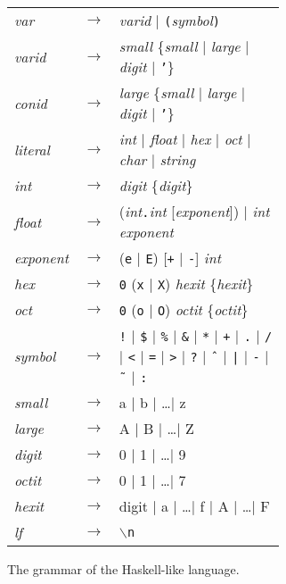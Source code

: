 \begin{figure}
\begin{tabular}{l c p{0.72\linewidth}}
\textit{var} & $\rightarrow$ & \textit{varid} $|$ \texttt{(}\textit{symbol}\texttt{)}\\
\textit{varid} & $\rightarrow$ & \textit{small} \{\textit{small} $|$ \textit{large} $|$ \textit{digit} $|$ \texttt{'}\}\\
\textit{conid} & $\rightarrow$ & \textit{large} \{\textit{small} $|$ \textit{large} $|$ \textit{digit} $|$ \texttt{'}\}\\
\textit{literal} & $\rightarrow$ & \textit{int} $|$ \textit{float} $|$ \textit{hex} $|$ \textit{oct} $|$ \textit{char} $|$ \textit{string}\\
\textit{int} & $\rightarrow$ & \textit{digit} \{\textit{digit}\}\\
\textit{float} & $\rightarrow$ & (\textit{int}\texttt{.}\textit{int} [\textit{exponent}]) $|$ \textit{int} \textit{exponent}\\
\textit{exponent} & $\rightarrow$ & (\texttt{e} $|$ \texttt{E}) [\texttt{+} $|$ \texttt{-}] \textit{int}\\
\textit{hex} & $\rightarrow$ & \texttt{0} (\texttt{x} $|$ \texttt{X}) \textit{hexit} \{\textit{hexit}\}\\
\textit{oct} & $\rightarrow$ & \texttt{0} (\texttt{o} $|$ \texttt{O}) \textit{octit} \{\textit{octit}\}\\
\textit{symbol} & $\rightarrow$ & \texttt{!} $|$ \texttt{\$} $|$ \texttt{\%} $|$ \texttt{\&} $|$ \texttt{*} $|$ \texttt{+} $|$ \texttt{.} $|$ \texttt{/} $|$ \texttt{<} $|$ \texttt{=} $|$ \texttt{>} $|$ \texttt{?} $|$ \texttt{ˆ} $|$ \texttt{|} $|$ \texttt{-} $|$ \texttt{˜} $|$ \texttt{:}\\
\textit{small} & $\rightarrow$ & a $|$ b $|$ \ldots $|$ z\\
\textit{large} & $\rightarrow$ & A $|$ B $|$ \ldots $|$ Z\\
\textit{digit} & $\rightarrow$ & 0 $|$ 1 $|$ \ldots $|$ 9\\
\textit{octit} & $\rightarrow$ & 0 $|$ 1 $|$ \ldots $|$ 7\\
\textit{hexit} & $\rightarrow$ & digit $|$ a $|$ \ldots $|$ f $|$ A $|$ \ldots $|$ F\\
\textit{lf} & $\rightarrow$ & \texttt{$\backslash$n}\\

\end{tabular}
    \caption{The grammar of the Haskell-like language.}
    \label{fig:grammar}
\end{figure}